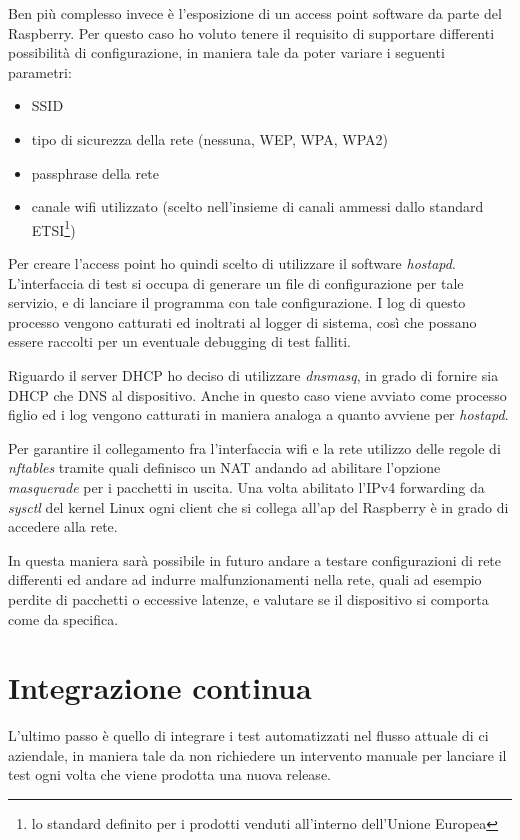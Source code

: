 \documentclass[12pt,a4paper,twoside,titlepage]{book}
\begin{document}
Ben più complesso invece è l'esposizione di un access point software da parte del
Raspberry. Per questo caso ho voluto tenere il requisito di supportare differenti
possibilità di configurazione, in maniera tale da poter variare i seguenti parametri:
\begin{itemize}
    \item SSID
    \item tipo di sicurezza della rete (nessuna, WEP, WPA, WPA2)
    \item passphrase della rete
    \item canale \Gls{wifi} utilizzato (scelto nell'insieme di canali ammessi dallo standard ETSI\footnote{
        lo standard definito per i prodotti venduti all'interno dell'Unione Europea})
\end{itemize}

Per creare l'access point ho quindi scelto di utilizzare il software \textit{hostapd}.
L'interfaccia di test si occupa di generare un file di configurazione per tale
servizio, e di lanciare il programma con tale configurazione. I log di questo processo vengono
catturati ed inoltrati al logger di sistema, così che possano essere raccolti
per un eventuale debugging di test falliti.

Riguardo il server DHCP ho deciso di utilizzare \textit{dnsmasq}, 
in grado di fornire sia DHCP che DNS al dispositivo.
Anche in questo caso viene avviato come processo figlio ed i log vengono catturati
in maniera analoga a quanto avviene per \textit{hostapd}.

Per garantire il collegamento fra l'interfaccia \Gls{wifi} e la rete utilizzo delle 
regole di \textit{nftables} tramite quali definisco un NAT andando ad abilitare l'opzione
\textit{masquerade} per i pacchetti in uscita. Una volta abilitato l'IPv4
forwarding da \textit{sysctl} del kernel Linux ogni client che si collega all'\acrshort{ap}
del Raspberry è in grado di accedere alla rete. 

In questa maniera sarà possibile in futuro andare a testare configurazioni
di rete differenti ed andare ad indurre malfunzionamenti nella rete, quali ad esempio
perdite di pacchetti o eccessive latenze, e valutare se il dispositivo si comporta come
da specifica.

\section{Integrazione continua}

L'ultimo passo è quello di integrare i test automatizzati nel flusso attuale 
di \acrfull{ci} aziendale, in maniera tale da non richiedere 
un intervento manuale per lanciare il test ogni volta che viene prodotta una nuova release. 
\end{document}
